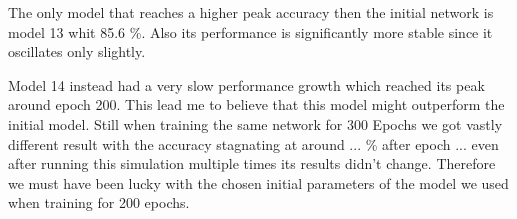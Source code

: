 \documentclass[
a4paper, 
12pt,
grayscalebody, %
abstract=on,
twoside, BCOR10mm, 12pt, DIV13,headinclude, footexclude, final, abstracton, openright
]{ibireprt}
\numberwithin{equation}{chapter}
\numberwithin{table}{chapter}
\numberwithin{figure}{chapter}
\numberwithin{algorithm}{chapter}
\numberwithin{example}{chapter}
\numberwithin{example}{chapter}
\begin{document}
The only model that reaches a higher peak accuracy  then the initial network is model 13 whit 85.6 \%. Also its performance is significantly more stable since it oscillates only slightly.

Model 14 instead had a very slow performance growth which reached its peak around epoch 200. This lead me to believe that this model might outperform the initial model. Still when training the same network for 300 Epochs we got vastly different result with the accuracy stagnating at around ... \% after epoch ... even after running this simulation multiple times its results didn't change. Therefore we must have been lucky with the chosen initial parameters of the model we used when training for 200 epochs.
\end{document}
